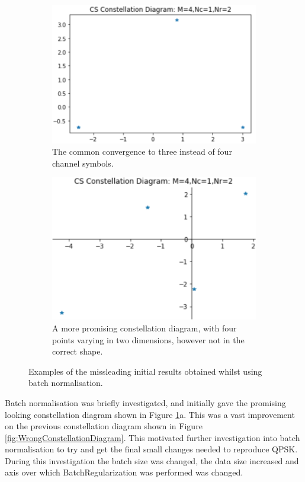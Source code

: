 \documentclass[12pt,onecolumn,letterpaper]{article}
\begin{document}
\begin{figure}[t!]
\begin{subfigure}[t]{0.24\textwidth}
       \includegraphics[width=\linewidth]{figures/ae2_2_wrong_const_diag_3points.png}
       \caption{The common convergence to three instead of four channel symbols.}
   \end{subfigure}
   \hfill
   \begin{subfigure}[t]{0.24\textwidth}
       \centering
       \includegraphics[width=\linewidth]{figures/ae2_2_wrong_qpsk_kite_w_title.png}
       \caption{A more promising constellation diagram, with four points varying in two dimensions, however not in the correct shape.}
   \end{subfigure}
   \caption{Examples of the missleading initial results obtained whilst using batch normalisation.}
   \label{fig:BatchNormConstDiags}
\end{figure}


Batch normalisation was briefly investigated, and initially gave the promising looking constellation diagram shown in Figure \ref{fig:BatchNormConstDiags}a. This was a vast improvement on the previous constellation diagram shown in Figure \ref{fig:WrongConstellationDiagram}. This motivated further investigation into batch normalisation to try and get the final small changes needed to reproduce QPSK. During this investigation 
the batch size was changed, the data size increased and axis over which BatchRegularization was performed was changed.
\end{document}
